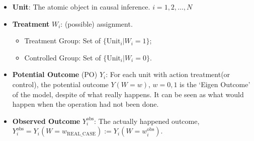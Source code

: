     \begin{itemize}[topsep=2pt,itemsep=0pt]
        \item \textbf{Unit}: The atomic object in causal inference. $ i=1,2,\ldots,N $
        \item \textbf{Treatment} $ W_i $: (possible) assignment.
        \begin{itemize}[topsep=2pt,itemsep=0pt]
            \item Treatment Group: Set of $ \{\mathrm{Unit}_i|W_i=1\} $;
            \item Controlled Group: Set of $ \{\mathrm{Unit}_i|W_i=0 \} $.
        \end{itemize}
        \item \textbf{Potential Outcome} (PO) $ Y_i $: For each unit with action  treatment(or control), the potential outcome $ Y(W=w),\,w=0,1 $ is the `Eigen Outcome' of the model, despite of what really happens. It can be seen as what would happen when the operation had not been done.
        \item \textbf{Observed Outcome} $ Y_i^\mathrm{obs}  $: The actually happened outcome, $ Y_i^\mathrm{obs}=Y_i(W=w_\mathrm{REAL\_CASE}):=Y_i(W=w_i^\mathrm{obs} ) $.
        

\end{itemize}
